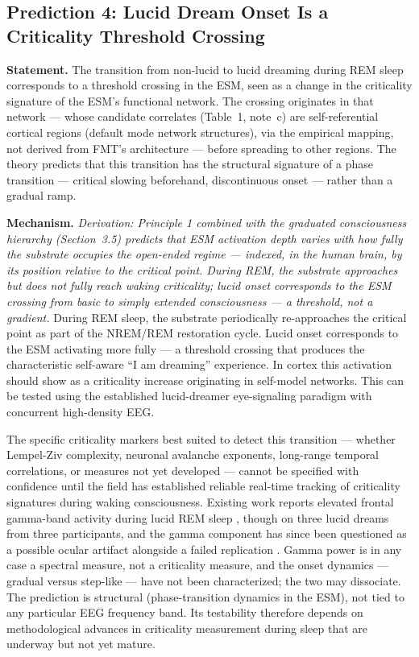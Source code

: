 \documentclass[12pt]{article}
\begin{document}
\subsection{Prediction 4: Lucid Dream Onset Is a Criticality Threshold Crossing}


\textbf{Statement.} The transition from non-lucid to lucid dreaming during REM sleep corresponds to a threshold crossing in the ESM, seen as a change in the criticality signature of the ESM's functional network. The crossing originates in that network --- whose candidate correlates (Table~1, note~c) are self-referential cortical regions (default mode network structures), via the empirical mapping, not derived from FMT's architecture --- before spreading to other regions. The theory predicts that this transition has the structural signature of a phase transition --- critical slowing beforehand, discontinuous onset --- rather than a gradual ramp.

\textbf{Mechanism.} \emph{Derivation: Principle 1 combined with the graduated consciousness hierarchy (Section~3.5) predicts that ESM activation depth varies with how fully the substrate occupies the open-ended regime --- indexed, in the human brain, by its position relative to the critical point. During REM, the substrate approaches but does not fully reach waking criticality; lucid onset corresponds to the ESM crossing from basic to simply extended consciousness --- a threshold, not a gradient.} During REM sleep, the substrate periodically re-approaches the critical point as part of the NREM/REM restoration cycle. Lucid onset corresponds to the ESM activating more fully --- a threshold crossing that produces the characteristic self-aware ``I am dreaming'' experience. In cortex this activation should show as a criticality increase originating in self-model networks. This can be tested using the established lucid-dreamer eye-signaling paradigm \citep{LaBerge1985} with concurrent high-density EEG.

The specific criticality markers best suited to detect this transition --- whether Lempel-Ziv complexity, neuronal avalanche exponents, long-range temporal correlations, or measures not yet developed --- cannot be specified with confidence until the field has established reliable real-time tracking of criticality signatures during waking consciousness. Existing work reports elevated frontal gamma-band activity during lucid REM sleep \citep{Voss2009}, though on three lucid dreams from three participants, and the gamma component has since been questioned as a possible ocular artifact alongside a failed replication \citep{Baird2019}. Gamma power is in any case a spectral measure, not a criticality measure, and the onset dynamics --- gradual versus step-like --- have not been characterized; the two may dissociate. The prediction is structural (phase-transition dynamics in the ESM), not tied to any particular EEG frequency band. Its testability therefore depends on methodological advances in criticality measurement during sleep that are underway but not yet mature.
\end{document}
